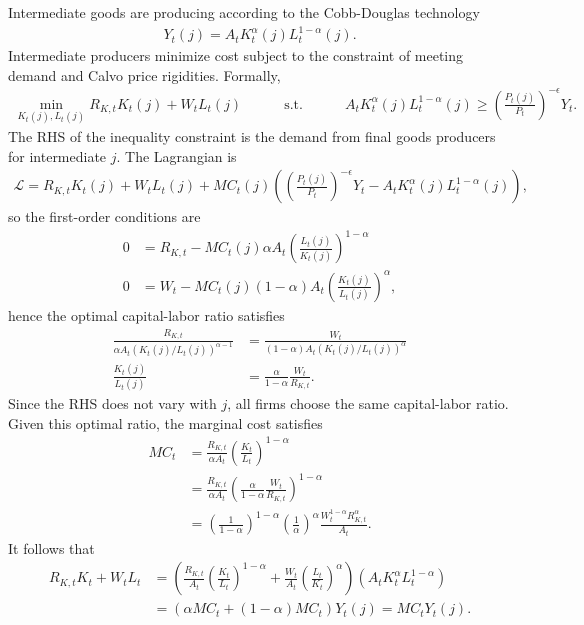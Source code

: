 \documentclass[12 pt, oneside]{article}
\theoremstyle{definition}
\theoremstyle{definition}
\theoremstyle{definition}
\newcommand{\calL}{\mathcal{L}}
\begin{document}
Intermediate goods are producing according to the Cobb-Douglas technology
\begin{align*}
  Y_t(j) = A_t K_t^\alpha(j)L_t^{1 - \alpha}(j).
\end{align*}
Intermediate producers minimize cost subject to the constraint of meeting demand and Calvo price rigidities. Formally,
\begin{align*}
  \min_{K_t(j), L_t(j)} R_{K, t} K_t(j) + W_t L_t(j)\quad\quad\quad\text{s.t.}\quad\quad\quad A_t K_t^\alpha(j) L_t^{1 - \alpha}(j) \geq \left(\frac{P_t(j)}{P_t}\right)^{-\epsilon}Y_t.
\end{align*}
The RHS of the inequality constraint is the demand from final goods producers for intermediate $j$. The Lagrangian is
\begin{align*}
  \calL = R_{K, t} K_t(j) + W_t L_t(j) + MC_t(j)\left(\left(\frac{P_t(j)}{P_t}\right)^{-\epsilon}Y_t - A_t K_t^\alpha(j) L_t^{1 - \alpha}(j)\right),
\end{align*}
so the first-order conditions are
\begin{align*}
  0 & = R_{K, t} - MC_t(j) \alpha A_t \left(\frac{L_t(j)}{K_t(j)}\right)^{1 - \alpha}\\
  0 & = W_t - MC_t(j) (1-\alpha) A_t \left(\frac{K_t(j)}{L_t(j)}\right)^{\alpha},
\end{align*}
hence the optimal capital-labor ratio satisfies
\begin{align*}
  \frac{R_{K, t}}{\alpha A_t(K_t(j)/L_t(j))^{\alpha - 1}} & = \frac{W_t}{(1-\alpha) A_t(K_t(j)/L_t(j))^{ \alpha}}\\
  \frac{K_t(j)}{L_t(j)} & =\frac{\alpha}{1 - \alpha} \frac{W_t}{R_{K, t}}.
\end{align*}
Since the RHS does not vary with $j$, all firms choose the same capital-labor ratio. Given this optimal ratio, the marginal cost satisfies
\begin{align*}
  MC_t & = \frac{R_{K, t}}{\alpha A_t}\left(\frac{K_t}{L_t}\right)^{1 - \alpha}\\
       & =  \frac{R_{K, t}}{\alpha A_t}\left(\frac{\alpha}{1 - \alpha} \frac{W_t}{R_{K, t}}\right)^{1 - \alpha}\\
       & =  \left(\frac{1}{1 - \alpha}\right)^{1 - \alpha}\left(\frac{1}{\alpha}\right)^{\alpha}\frac{W_t^{1 - \alpha}R_{K, t}^{\alpha}}{ A_t}.
\end{align*}
It follows that
\begin{align*}
  R_{K, t}K_t + W_tL_t & = \left(\frac{R_{K, t}}{A_t}\left(\frac{K_t}{L_t}\right)^{1 - \alpha} + \frac{W_t}{A_t}\left(\frac{L_t}{K_t}\right)^{\alpha}\right)(A_tK_t^\alpha L_t^{1 - \alpha})\\
                       & = \left(\alpha MC_t + (1 - \alpha)MC_t\right)Y_t(j) = MC_t Y_t(j).
\end{align*}
\end{document}
